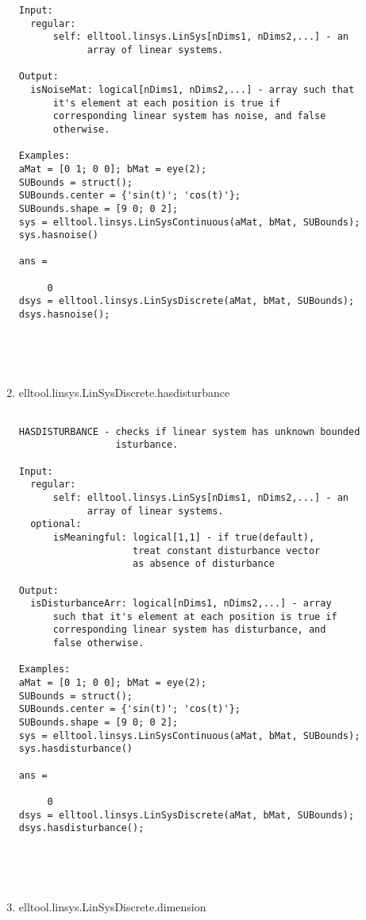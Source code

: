 \begin{enumerate}
\begin{lstlisting}
Input:
  regular:
      self: elltool.linsys.LinSys[nDims1, nDims2,...] - an
            array of linear systems.

Output:
  isNoiseMat: logical[nDims1, nDims2,...] - array such that
      it's element at each position is true if
      corresponding linear system has noise, and false
      otherwise.

Examples:
aMat = [0 1; 0 0]; bMat = eye(2);
SUBounds = struct();
SUBounds.center = {'sin(t)'; 'cos(t)'};
SUBounds.shape = [9 0; 0 2];
sys = elltool.linsys.LinSysContinuous(aMat, bMat, SUBounds);
sys.hasnoise()

ans =

     0
dsys = elltool.linsys.LinSysDiscrete(aMat, bMat, SUBounds);
dsys.hasnoise();





\end{lstlisting}
\fontfamily{\familydefault}
\selectfont
\item {elltool.linsys.LinSysDiscrete.hasdisturbance}
\selectfont
\begin{lstlisting}

HASDISTURBANCE - checks if linear system has unknown bounded
                 isturbance.

Input:
  regular:
      self: elltool.linsys.LinSys[nDims1, nDims2,...] - an
            array of linear systems.
  optional:
      isMeaningful: logical[1,1] - if true(default),
                    treat constant disturbance vector
                    as absence of disturbance

Output:
  isDisturbanceArr: logical[nDims1, nDims2,...] - array
      such that it's element at each position is true if
      corresponding linear system has disturbance, and
      false otherwise.

Examples:
aMat = [0 1; 0 0]; bMat = eye(2);
SUBounds = struct();
SUBounds.center = {'sin(t)'; 'cos(t)'};
SUBounds.shape = [9 0; 0 2];
sys = elltool.linsys.LinSysContinuous(aMat, bMat, SUBounds);
sys.hasdisturbance()

ans =

     0
dsys = elltool.linsys.LinSysDiscrete(aMat, bMat, SUBounds);
dsys.hasdisturbance();





\end{lstlisting}
\fontfamily{\familydefault}
\selectfont
\item {elltool.linsys.LinSysDiscrete.dimension}
\selectfont
\begin{lstlisting}


\end{lstlisting}
\end{enumerate}

